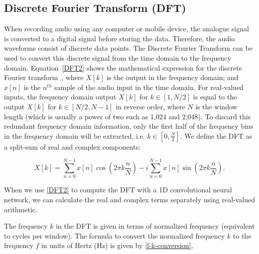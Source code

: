 \documentclass{ieeeaccess}
\begin{document}
\subsection{Discrete Fourier Transform (DFT)} \label{chap:DFT}
When recording audio using any computer or mobile device, the analogue signal is converted to a digital signal before storing the data. Therefore, the audio waveforms consist of discrete data points. The Discrete Fourier Transform can be used to convert this discrete signal from the time domain to the frequency domain. Equation~\eqref{DFT2} shows the mathematical expression for the discrete Fourier transform~\cite{wang1984fast}, where $X[k]$ is the output in the frequency domain; and $x[n]$ is the $n^{th}$ sample of the audio input in the time domain. For real-valued inputs, the frequency domain output $X[k]$ for $k \in [1,N/2]$ is equal to the output $X[k]$ for $k \in [N/2,N-1]$ in reverse order, where $N$ is the window length (which is usually a power of two such as 1,024 and 2,048). To discard this redundant frequency domain information, only the first half of the frequency bins in the frequency domain will be extracted, i.e. $k \in [0,\frac{N}{2}]$. We define the DFT as a split-sum of real and complex components:



\begin{equation} 
X[k] = \sum_{n=0}^{N-1}x[n] \cos(2\pi k \frac{n}{N}) - i \sum_{n=0}^{N-1}x[n]\sin(2\pi k \frac{n}{N})
\label{DFT2}.
\end{equation}


When we use \eqref{DFT2} to compute the DFT with a 1D convolutional neural network, we can calculate the real and complex terms separately using real-valued arithmetic.



The frequency $k$ in the DFT is given in terms of normalized frequency (equivalent to cycles per window). The formula to convert the normalized frequency $k$ to the frequency $f$ in units of Hertz (Hz) is given by \eqref{f-k-conversion},
\end{document}
